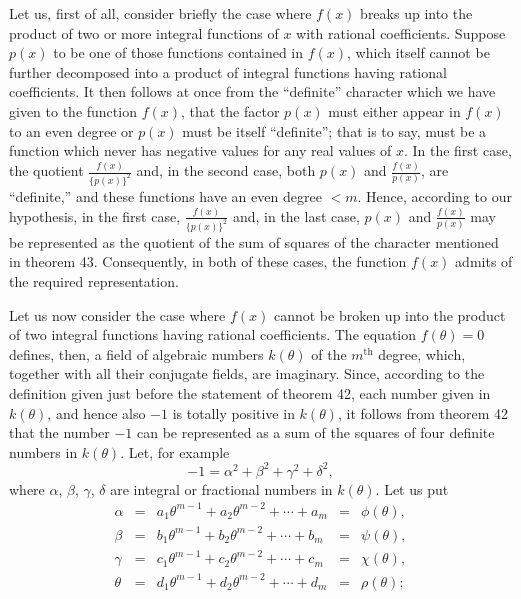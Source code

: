 \documentclass[11pt,oneside]{book}
\begin{document}
Let us, first of all, consider briefly the case where
$f(x)$ breaks up into the product of two or more integral
functions of $x$ with rational coefficients. Suppose
$p(x)$ to be one of those functions contained in
$f(x)$, which itself cannot be further decomposed into
a product of integral functions having rational coefficients.
It then follows at once from the ``definite''
character which we have given to the function $f(x)$,
that the factor $p(x)$ must either appear in $f(x)$ to an
even degree or $p(x)$ must be itself ``definite''; that
is to say, must be a function which never has negative
values for any real values of $x$. In the first case,
the quotient $\frac{f(x)}{\{p(x)\}^2}$ and, in the second case, both $p(x)$
and $\frac{f(x)}{p(x)}$, are ``definite,'' and these functions have an
even degree $< m$. Hence, according to our hypothesis,
in the first case, $\frac{f(x)}{\{p(x)\}^2}$ and, in the last case, $p(x)$
and $\frac{f(x)}{p(x)}$ may be represented as the quotient of the
sum of squares of the character mentioned in theorem
43. Consequently, in both of these cases, the function
$f(x)$ admits of the required representation.

Let us now consider the case where $f(x)$ cannot
be broken up into the product of two integral functions
having rational coefficients. The equation $f(\theta)=0$ defines,
then, a field of algebraic numbers $k(\theta)$ of the
$m^\text{th}$ degree, which, together with all their conjugate
fields, are imaginary. Since, according to the definition
given just before the statement of theorem 42,
each number given in $k(\theta)$, and hence also $-1$ is totally
positive in $k(\theta)$, it follows from theorem 42 that
the number $-1$ can be represented as a sum of the
squares of four definite numbers in $k(\theta)$. Let, for example
\[
\tag{1}
-1 = \alpha^2 + \beta^2 + \gamma^2 + \delta^2,
\]
where $\alpha$, $\beta$, $\gamma$, $\delta$ are integral or fractional numbers in
$k(\theta)$. Let us put
\begin{equation*}
\begin{array}{rcccl}
\alpha & = & a_1 \theta^{m-1} + a_2 \theta^{m-2} + \cdots + a_m  & = & \phi(\theta), \\
\beta  & = & b_1 \theta^{m-1} + b_2 \theta^{m-2} + \cdots + b_m  & = & \psi(\theta), \\
\gamma & = & c_1 \theta^{m-1} + c_2 \theta^{m-2} + \cdots + c_m  & = & \chi(\theta), \\
\theta & = & d_1 \theta^{m-1} + d_2 \theta^{m-2} + \cdots + d_m  & = & \rho(\theta);
\end{array}
\end{equation*}
\end{document}
